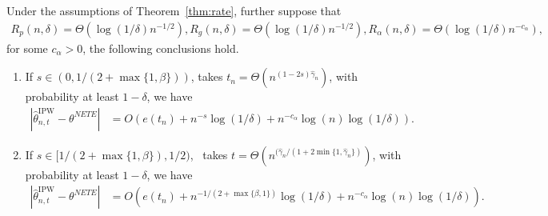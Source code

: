 \documentclass[10pt,a4paper]{amsart}
\begin{document}
\begin{corollary}
  \label{cor:rate_ipw}Under the assumptions of Theorem~\ref{thm:rate}, further
  suppose that
  \begin{align*}
    R_p (n, \delta) = \Theta (\log (1 / \delta) n^{- 1 / 2}) , R_g (n, \delta) = \Theta (\log (1 / \delta) n^{- 1 / 2}), R_\alpha (n, \delta) = \Theta( \log(1/\delta) n^{-c_\alpha}),
  \end{align*}
  for some $c_\alpha > 0 $, the following conclusions hold.
  \begin{enumerate}
    \item If $s \in (0, 1 / (2 + \max \{1, \beta\}))$, takes $t_n = \Theta (n^{
    (1 - 2 s) \hat{\gamma}_{n}})$, with probability at least $1 - \delta$,
    we have
    \begin{align*}
      | {{\widehat{\theta }_{n, t}^{\text{IPW} }} }   - \theta^{NETE} | & = O
      (e (t_n) + n^{- s} \log (1 / \delta) +  n^{-c_\alpha} \log(n)\log (1 / \delta)) .
    \end{align*}
    \item If $s \in [1 / (2 + \max \{1, \beta\}), 1 / 2)$, \ takes $t = \Theta
    (n^{(\hat{\gamma}_{n} / (1 + 2 \min \{1, \hat{\gamma}_{n} \})})$,
    with probability at least $1 - \delta$, we have
    \begin{align*}
      | {{\widehat{\theta }_{n, t}^{\text{IPW} }} }   - \theta^{NETE} | & = O
      (e (t_n) + n^{- 1 / (2 + \max \{\beta, 1\})} \log (1 / \delta) +  n^{-c_\alpha} \log(n)\log (1 / \delta)) .
    \end{align*}
  \end{enumerate}
\end{corollary}
\end{document}
